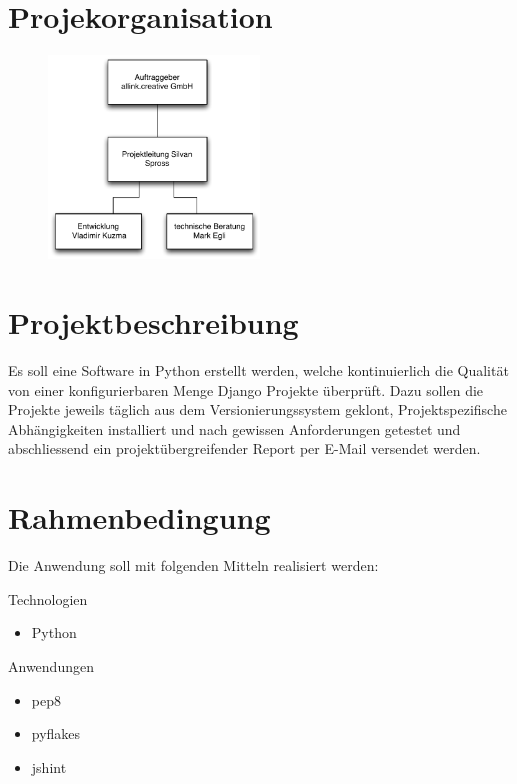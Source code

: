 \section{Projekorganisation}

\begin{figure}[!ht]
\begin{center}
    \includegraphics[width=0.5\textwidth,angle=0]{./grafiken/organigram.pdf}
\end{center}
\end{figure}

\section{Projektbeschreibung}
Es soll eine Software in Python erstellt werden, welche kontinuierlich die Qualität von einer konfigurierbaren Menge Django Projekte überprüft. Dazu sollen die Projekte jeweils täglich aus dem Versionierungssystem geklont, Projektspezifische Abhängigkeiten installiert und nach gewissen Anforderungen getestet und abschliessend ein projektübergreifender Report per E-Mail versendet werden.

\section{Rahmenbedingung}
Die Anwendung soll mit folgenden Mitteln realisiert werden:

Technologien
\begin{itemize}
    \item Python 

\end{itemize}

Anwendungen
\begin{itemize}
    \item pep8
    \item pyflakes
    \item jshint
\end{itemize}

